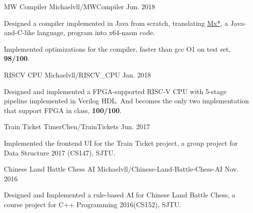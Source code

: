 
\begin{cventries}
	\cvproject
	{MW Compiler}
	{Michaelvll/MWCompiler}
	{Jun. 2018}
	{
		\begin{cvitems}
            \item {Designed a compiler implemented in Java from scratch, translating \href{https://acm.sjtu.edu.cn/w/images/3/30/M_language_manual.pdf}{Mx*}, a Java-and-C-like language, program into x64-nasm code.}
            \item {Implemented optimizations for the compiler, faster than gcc O1 on test set, \textbf{98/100}.}
		\end{cvitems}
	}
	\cvproject
	{RISCV CPU}
	{Michaelvll/RISCV\_CPU}
	{Jan. 2018}
	{
		\begin{cvitems}
			\item {Designed and implemented a FPGA-supported RISC-V CPU with 5-stage pipeline implemented in Verilog HDL. And becomes the only two implementation that support FPGA in class, \textbf{100/100}.}
		\end{cvitems}
    }
    \cvproject
    {Train Ticket}
    {TimerChen/TrainTickets}
    {Jun. 2017}
    {
        \begin{cvitems}
            \item {Implemented the frontend UI for the Train Ticket project, a group project for Data Structure 2017 (CS147), SJTU.}
        \end{cvitems}
    }
    \cvproject
    {Chinese Land Battle Chess AI}
    {Michaelvll/Chinese-Land-Battle-Chess-AI}
    {Nov. 2016}
    {
        \begin{cvitems}
            \item {Designed and Implemented a rule-based AI for Chinese Land Battle Chess, a  course project for  C++ Programming 2016(CS152), SJTU.}
        \end{cvitems}
    }
\end{cventries}

